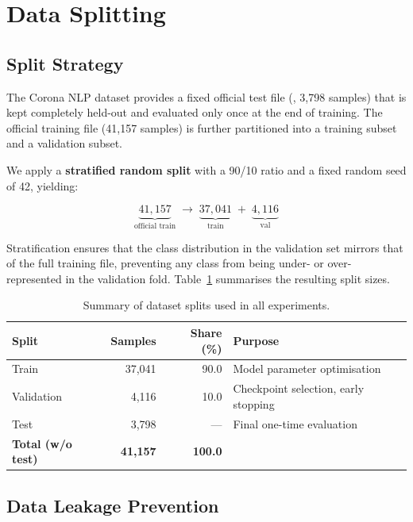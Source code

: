 \section{Data Splitting}

\subsection{Split Strategy}

The Corona NLP dataset provides a fixed official test file (, 3,798 samples) that is kept completely held-out and evaluated only once at the end of training. The official training file (41,157 samples) is further partitioned into a training subset and a validation subset.

We apply a \textbf{stratified random split} with a 90/10 ratio and a fixed random seed of 42, yielding:

\begin{equation}
    \underbrace{41{,}157}_{\text{official train}} \;\longrightarrow\;
    \underbrace{37{,}041}_{\text{train}} \;+\; \underbrace{4{,}116}_{\text{val}}
\end{equation}

Stratification ensures that the class distribution in the validation set mirrors that of the full training file, preventing any class from being under- or over-represented in the validation fold. Table~\ref{tab:split_summary} summarises the resulting split sizes.

\begin{table}[H]
    \centering
    \caption{Summary of dataset splits used in all experiments.}
    \label{tab:split_summary}
    \begin{tabularx}{\textwidth}{l r r l}
        \toprule
        \textbf{Split} & \textbf{Samples} & \textbf{Share (\%)} & \textbf{Purpose} \\
        \midrule
        Train      & 37,041 & 90.0 & Model parameter optimisation \\
        Validation & 4,116  & 10.0 & Checkpoint selection, early stopping \\
        Test        & 3,798  & ---  & Final one-time evaluation \\
        \midrule
        \textbf{Total (w/o test)} & \textbf{41,157} & \textbf{100.0} & \\
        \bottomrule
    \end{tabularx}
\end{table}

\subsection{Data Leakage Prevention}

